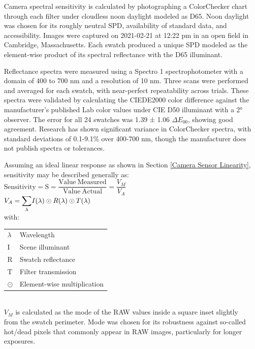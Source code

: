 \documentclass[twocolumn,10pt]{asme2ej}
\newcommand{\id}{\hspace{6 mm}}
\begin{document}
Camera spectral sensitivity is calculated by photographing a ColorChecker chart through each filter under cloudless noon daylight modeled as D65. Noon daylight was chosen for its roughly neutral SPD, availability of standard data, and accessibility. Images were captured on 2021-02-21 at 12:22 pm in an open field in Cambridge, Massachusetts. Each swatch produced a unique SPD modeled as the element-wise product of its spectral reflectance with the D65 illuminant. \cite{CVRL}

\id Reflectance spectra were measured using a Spectro 1 spectrophotometer with a domain of 400 to 700 nm and a resolution of 10 nm. Three scans were performed and averaged for each swatch, with near-perfect repeatability across trials. These spectra were validated by calculating the CIEDE2000 color difference against the manufacturer's published Lab color values under CIE D50 illuminant with a 2° observer. \cite{X-Rite} The error for all 24 swatches was 1.39 ± 1.06 $\Delta E_{00}$, showing good agreement. Research has shown significant variance in ColorChecker spectra, with standard deviations of 0.1-9.1\% over 400-700 nm, though the manufacturer does not publish spectra or tolerances. \cite{BabelColor}

\id Assuming an ideal linear response as shown in Section \ref{Camera Sensor Linearity}, sensitivity may be described generally as:\\

$\mathrm{ Sensitivity = S = \dfrac{Value \ Measured}{Value \ Actual} } = \dfrac{V_M}{V_A}$ \\

$V_A = \mathlarger{\sum_{\lambda}} I(\lambda) \odot R(\lambda) \odot T(\lambda)$ \\

with: \\

\begin{tabular}{l | l}
$\lambda$ & Wavelength \\
I & Scene illuminant\\
R & Swatch reflectance \\
T & Filter transmission \\
$\odot$ & Element-wise multiplication \\
\end{tabular} \\

$V_M$ is calculated as the mode of the RAW values inside a square inset slightly from the swatch perimeter. Mode was chosen for its robustness against so-called hot/dead pixels that commonly appear in RAW images, particularly for longer exposures.
\end{document}
